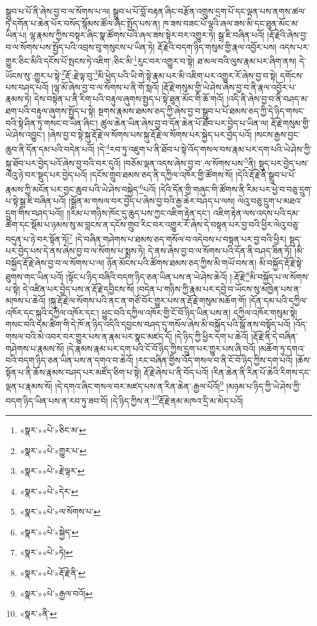 སྒྲུབ་པ་པོ་ནི་ཞེས་བྱ་བ་ལ་སོགས་པ་ལ། སྒྲུབ་པ་པོ་བློ་བརྟན་ཞིང་བརྩོན་འགྲུས་དྲག་པོ་དང་ལྡན་པས་ནགས་ཚལ་ཏེ་དགོན་པ་ཆེན་པོར་བསོད་སྙོམས་ཚོལ་ཞིང་སྤྱོད་པས་ན། ཁ་ཟས་བཟང་པོ་ལྷའི་ཞལ་ཟས་མི་དང་ཐུན་མོང་མ་ཡིན་པ། ལྷ་རྣམས་ཀྱིས་བསྟར་ཞིང་སྣ་ཚོགས་པའི་ཞལ་ཟས་སྟེར་བར་འགྱུར་ཏེ། སྒྲ་ཇི་བཞིན་པའོ། །རྡོ་རྗེའི་ཞེས་བྱ་བ་ལ་སོགས་པས་སྤྱོད་པའི་འབྲས་བུ་གསུངས་པ་ཡིན་ཏེ། རྡོ་རྗེའི་བདག་ཉིད་གསུམ་གྱི་རྣལ་འབྱོར་པས། འདས་པར་གྱུར་ཅིང་མིའི་དངོས་པོ་སྤངས་ཏེ་འཇིག་:ཅིང་མི་\footnote{«སྣར་»«པེ་»ཅིང་མ་}རུང་བར་འགྱུར་བ་སྟེ། ཐ་མལ་བའི་ལུས་རྣམ་པར་ཞིག་ནས། དེ་ཡོངས་སུ་:གྱུར་པ་སྟེ་\footnote{«སྣར་»«པེ་»གྱུར་པ་}རྡོ་:རྗེ་ལྟ་བུ་\footnote{«སྣར་»«པེ་»རྗེ་ལྟར་}མི་ཕྱེད་པའི་ཡི་གེ་སྟེ་རྣམ་པར་མི་འཇིག་པར་འགྱུར་རོ་ཞེས་བྱ་བ་སྟེ། དགོངས་པས་བཤད་པའོ། །ལྷ་མོ་ཞེས་བྱ་བ་ལ་སོགས་པ་ནི་གོ་སླའོ། །རྡོ་རྗེ་གསུམ་གྱི་ཡེ་ཤེས་ཞེས་བྱ་བ་ནི་རྣལ་འབྱོར་པ་རྣམས་ཏེ། དེས་བསྟེན་པ་ནི་རིག་པའི་བརྟུལ་ཞུགས་སྤྱད་པ་སྟེ་ཐུན་མོང་གི་ཆོ་གའོ། །འདི་ནི་ཞེས་བྱ་བ་ནི་བཤད་མ་ཐག་པའི་བརྟུལ་ཞུགས་སྤྱོད་པ་སྟེ། སྔགས་རྣམས་ཐམས་ཅད་ཀྱི་ཞེས་བྱ་བ་སྒྲུབ་པ་པོ་ཐམས་ཅད་ཀྱི་དེ་ཉིད་གསང་བའི་སྟེ་ཤིན་ཏུ་གསང་བ་ཡིན་ཞིང་། ཚུལ་ཆེན་ཡིན་ཞེས་བྱ་བ་དོན་ཆེན་པོ་ཐོབ་པར་བྱེད་པ་ཡིན་ལ། རྡོ་རྗེ་གསུམ་གྱི་ཡེ་ཤེས་འབྱུང་། །ཞེས་བྱ་བ་སྟེ་སྐུ་རྡོ་རྗེ་ལ་སོགས་པས་སྐུ་རྡོ་རྗེ་ལ་སོགས་པར་སྐྱེད་པར་བྱེད་པའོ། །སངས་རྒྱས་བྱང་ཆུབ་ནི་དོན་དམ་པའི་བདེན་པའོ། །དེ་\footnote{«སྣར་»«པེ་»དེར་}རབ་ཏུ་འཇུག་པ་ནི་ཐོབ་པ་སྟེ་འོད་གསལ་བས་རྣམ་པར་དག་པའི་ཡེ་ཤེས་ཀྱི་སྐུ་ཐོབ་པར་བྱེད་པའོ་ཞེས་བྱ་བའི་བར་དུའོ། །བཅོམ་ལྡན་འདས་ཞེས་བྱ་བ་:ལ་སོགས་པས་\footnote{«སྣར་»«པེ་»ལ་སོགས་པ་}ནི། སྡུད་པར་བྱེད་པས་ལེའུ་ཉེ་བར་སྡུད་པར་བྱེད་པའོ། །དངོས་གྲུབ་ཐམས་ཅད་ནི་དཀྱིལ་འཁོར་གྱི་ཚོགས་སོ། །དེའི་རྡོ་རྗེ་ནི་སྒྲུབ་པ་པོ་རྣམས་ཀྱི་མངོན་པར་བྱང་ཆུབ་པའི་ཡེ་ཤེས་བསྐྱེད་\footnote{«སྣར་»«པེ་»སྐྱེད་}པའོ། །དེའི་དོན་གྱི་གཞུང་གི་ཚོགས་ནི་རིམ་པར་ཕྱེ་བ་བཅུ་དྲུག་པ་སྟེ་སྒྲ་ཇི་བཞིན་པའོ། །སྒྲོན་མ་གསལ་བར་བྱེད་པ་ཞེས་བྱ་བའི་རྒྱ་ཆེར་བཤད་པ་ལས། ལེའུ་བཅུ་དྲུག་པ་མཐའ་དྲུག་གིས་བཤད་པའོ།། །།རིམ་པ་གཉིས་ཁོང་དུ་ཆུད་པས་ཀྱང་འཇིག་རྟེན་དང་། འཇིག་རྟེན་ལས་འདས་པའི་དམ་ཚིག་དང་སྡོམ་པ་ཉམས་སུ་མ་བླངས་ན་དངོས་གྲུབ་རིང་བར་འགྱུར་རོ་ཞེས་དེ་བསྟན་པར་བྱ་བའི་ཕྱིར་ལེའུ་བཅུ་བདུན་པ་ཉེ་བར་སྟོན་ཏོ།\footnote{«སྣར་»«པེ་»ཏེ།} །དེ་བཞིན་གཤེགས་པ་ཐམས་ཅད་གསོལ་བ་འདེབས་པ་བསྟན་པར་བྱ་བའི་ཕྱིར། སྡུད་པར་བྱེད་པས་དེ་ནས་ཞེས་བྱ་བ་ལ་སོགས་པ་སྨྲས་ཏེ། དེ་ནས་ཞེས་བྱ་བ་ལ་སོགས་པའི་དོན་ནི་བཤད་ཟིན་ཏོ། །མི་བསྐྱོད་རྡོ་རྗེ་ཞེས་བྱ་བ་ལ་སོགས་པ་ལ། ཉོན་མོངས་པའི་ཚོགས་ཐམས་ཅད་ཀྱིས་མི་གཡོ་བས་ན། མི་བསྐྱོད་རྡོ་རྗེ་སྟེ་ཐུགས་གང་ཡིན་པའོ། །སྟོང་པ་ཉིད་བཞིའི་བདག་ཉིད་ཅན་ཡིན་པས་ན་ཡེ་ཤེས་ཆེའོ། །:རྡོ་རྗེ་\footnote{«སྣར་»«པེ་»རྡོ་རྗེ་ནི་}མི་བསྐྱོད་པ་ལ་སོགས་པ་སྟེ། དེ་འཛིན་པར་བྱེད་པས་ན་རྡོ་རྗེ་དབྱིངས་སོ། །བདེན་པ་གཉིས་ཀྱི་རྣམ་པར་དབྱེ་བ་ཡོངས་སུ་མཁྱེན་པས་ན་མཁས་པ་ཆེའོ། །སྐུ་རྡོ་རྗེ་ལ་སོགས་པའི་ནང་ན་གཙོ་བོར་གྱུར་པས་ན་རྡོ་རྗེ་གསུམ་མཆོག་གོ། །དོན་དམ་པའི་དཀྱིལ་འཁོར་དང་སྐུའི་དཀྱིལ་འཁོར་དང་། ཕྱུང་བའི་དཀྱིལ་འཁོར་གྱི་ངོ་བོ་ཉིད་ཡིན་པས་ན། དཀྱིལ་འཁོར་གསུམ་སྟེ། གསང་བའི་དམ་ཚིག་གི་དེ་ཁོ་ན་ཉིད་འདིའི་དབྱངས་བཤད་དུ་གསོལ་ཞེས་མི་བསྐྱོད་པའི་སྒོ་ནས་བསྟོད་པའོ། །འོད་གསལ་བའི་མེ་འབར་བར་གྱུར་པས་ན་རྣམ་པར་སྣང་མཛད་དོ། །དེ་ཉིད་ཀྱི་ཕྱིར་དག་པ་ཆེའོ། །རྡོ་རྗེ་ནི་དེ་བཞིན་གཤེགས་པ་རྣམས་སོ། །དེ་རྣམས་རྣམ་པར་དག་པའི་ངོ་བོ་ཉིད་ཀྱིས་དྲུག་པར་གྱུར་པས་ཞི་བའོ། །མཆོག་ཏུ་དགའ་བའི་བདག་ཉིད་ཅན་ཡིན་པས་ན་དགའ་བ་ཆེའོ། །རང་བཞིན་གྱིས་འོད་གསལ་བ་ནི་ངོ་བོ་ཉིད་ཀྱིས་དག་པའོ། །ཆོས་སྟོན་པ་ནི་ཆོས་རྣམས་བཤད་པར་མཛོད་ཅིག་པ་སྟེ། རྡོ་རྗེ་ཞེས་པ་ནི་བོད་པའོ། །རིན་ཆེན་ནི་རིན་པོ་ཆེའི་རིགས་དང་ལྡན་པ་རྣམས་སོ། །དེ་དགའ་ཞིང་གསལ་བར་མཛད་པས་ན་རིན་ཆེན་:རྒྱལ་པོའོ།\footnote{«སྣར་»«པེ་»རྒྱལ་བའོ།} །མཉམ་པ་ཉིད་ཀྱི་ཡེ་ཤེས་ཀྱི་བདག་ཉིད་ཡིན་པས་ན་རབ་ཏུ་ཟབ་བོ། །དེ་ཉིད་ཀྱིས་ན་\footnote{«སྣར་»ནི་}རྡོ་རྗེ་ནམ་མཁའ་དྲི་མ་མེད་པའོ། 
